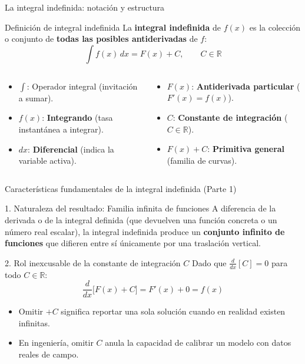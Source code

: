 \documentclass[aspectratio=169,11pt]{beamer}
\begin{document}
\begin{frame}{La integral indefinida: notación y estructura}
\small
\begin{block}{Definición de integral indefinida}
La \textbf{integral indefinida} de $f(x)$ es la colección o conjunto de \textbf{todas las posibles antiderivadas} de $f$:
\[
\int f(x)\,dx = F(x) + C, \qquad C \in \mathbb{R}
\]
\end{block}
\vspace{0.06cm}
\begin{columns}[T,onlytextwidth]
\begin{techbox}[title=Anatomía de la notación]
\footnotesize
\begin{itemize}[itemsep=2pt]
  \item $\displaystyle\int$: Operador integral (invitación a sumar).
  \item $f(x)$: \textbf{Integrando} (tasa instantánea a integrar).
  \item $dx$: \textbf{Diferencial} (indica la variable activa).
\end{itemize}
\end{techbox}
\begin{keybox}[title=Elementos de la solución]
\footnotesize
\begin{itemize}[itemsep=2pt]
  \item $F(x)$: \textbf{Antiderivada particular} ($F'(x)=f(x)$).
  \item $C$: \textbf{Constante de integración} ($C \in \mathbb{R}$).
  \item $F(x)+C$: \textbf{Primitiva general} (familia de curvas).
\end{itemize}
\end{keybox}
\end{columns}
\end{frame}

\begin{frame}{Características fundamentales de la integral indefinida (Parte 1)}
\small
\begin{block}{1. Naturaleza del resultado: Familia infinita de funciones}
A diferencia de la derivada o de la integral definida (que devuelven una función concreta o un número real escalar), la integral indefinida produce un \textbf{conjunto infinito de funciones} que difieren entre sí únicamente por una traslación vertical.
\end{block}
\vspace{0.08cm}
\begin{block}{2. Rol inexcusable de la constante de integración $C$}
Dado que $\frac{d}{dx}[C] = 0$ para todo $C \in \mathbb{R}$:
\[
\frac{d}{dx}\big[F(x) + C\big] = F'(x) + 0 = f(x)
\]
\begin{itemize}[itemsep=2pt]
  \item Omitir $+C$ significa reportar una sola solución cuando en realidad existen infinitas.
  \item En ingeniería, omitir $C$ anula la capacidad de calibrar un modelo con datos reales de campo.
\end{itemize}
\end{block}
\end{frame}
\end{document}
